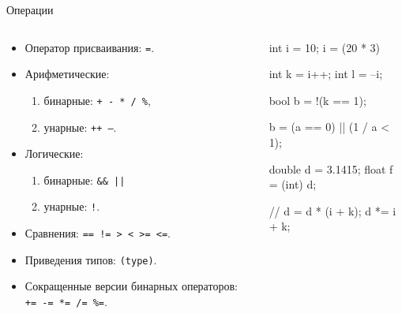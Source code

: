\documentclass[
    9pt,
    hyperref={pdfencoding=unicode}
    ]{beamer}
\begin{document}
\begin{frame}[fragile]{Операции}
    \begin{columns}
        \begin{column}{0.5\textwidth}
            \begin{itemize}
                \item Оператор присваивания: \alert{\texttt{=}}.
                \item Арифметические: 
                \begin{enumerate}
                    \item бинарные: \alert{\texttt{+ - * / \%}},
                    \item унарные: \alert{\texttt{++ --}}.
                \end{enumerate}
                \item Логические:
                \begin{enumerate}
                    \item бинарные: \alert{\texttt{\&\& ||}}
                    \item унарные: \alert{\texttt{!}}.
                \end{enumerate}
                \item Сравнения: \alert{\texttt{== != > < >= <=}}.
                \item Приведения типов: \alert{\texttt{(type)}}.
                \item Сокращенные версии бинарных операторов: \alert{\texttt{+= -= *= /= \%=}}.
            \end{itemize}
        \end{column}
        \begin{column}{0.5\textwidth}  %
            \begin{cppcode}
                int i = 10;
                i = (20 * 3) %
                
                int k = i++;
                int l = --i;
                
                bool b = !(k == 1);
                
                b = (a == 0) || (1 / a < 1);
                
                double d = 3.1415;
                float f = (int) d;
                
                // d = d * (i + k);
                d *= i + k;
            \end{cppcode}
        \end{column}
    \end{columns}
\end{frame}
\end{document}
